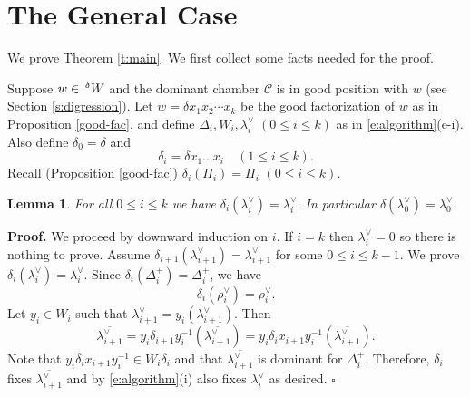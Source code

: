 \documentclass[10pt,leqno]{article}
\newtheorem{lemma}[equation]{Lemma}
\newcommand{\qed}{\hfill $\square$ \medskip}
\newenvironment{proof}[1][Proof]{\noindent\textbf{#1.} }{\qed}
\newcommand{\caC}{\mathcal C}
\renewcommand{\a}{\mathfrak a}
\newcommand{\ch}[1]{#1^\vee}
\renewcommand{\sec}[1]{\section{#1}
\renewcommand{\theequation}{\thesection.\arabic{equation}}
  \setcounter{equation}{0}}
\newcommand{\Wext}{\negthinspace\negthinspace\phantom{a}^\delta W}
\def\le{\leqslant}
\def\a{\alpha}
\def\d{\delta}
\def\l{\lambda}
\renewcommand{\sec}[1]{\section{#1}
\renewcommand{\theequation}{\thesection.\arabic{equation}}
  \setcounter{equation}{0}}
\begin{document}
\begin{comment}
Now one computes that $\l_1^\vee = \rho_1^\vee=(0, 3, 3, 5, 3, 0)$ and its dominant conjugate is $\overline{\l_1^\vee}=(3, 5, 6, 9, 6, 3)$. Note that $\rho^\vee=(8, 11, 15, 21, 15, 8)$. Then the full sequence gives
$$
t=\delta \exp(\frac{2\pi i}{6} \l_0)=\delta\exp(\frac{2\pi i}{6} (\rho^\vee + \overline{\l_1^\vee}))=\delta \exp(\frac{2\pi i}{6} (11, 16, 21, 30, 21, 11)).
$$
The partial sequence gives
$$
t'=\delta \exp(\frac{2\pi i}{3} \rho^\vee)=
\delta \exp(\frac{2\pi i}{6} (16, 22, 30, 42, 30, 16)).
$$
So $t \neq t'$. On the other hand, we have
\begin{gather*} t_1:=n(s_1 s_6) t n(s_1 s_6)^{-1} =\delta \exp(\frac{2\pi i}{6}(10, 16, 21, 30, 21, 10)); \\
t_2:=\a_3^\vee(-1) t_1 \a_3^\vee(-1)=\delta \exp(\frac{2\pi i}{6}(10, 16, 18, 30, 24, 10))=t'.
\end{gather*}
So $t$ is conjugate to $t'$.

\bigskip
\end{comment}

\sec{The General Case}
\label{s:general}

We prove Theorem \ref{t:main}. We first collect some facts needed for the proof.

Suppose $w\in \Wext$ and the dominant chamber $\caC$ is in good position with
$w$ (see Section \ref{s:digression}). Let $w=\d x_1 x_2 \cdots x_k$ be the good factorization of $w$ as
in Proposition \ref{good-fac}, and define $\Delta_i,W_i,\ch\lambda_i$
$(0\le i\le k)$ as in \eqref{e:algorithm}(e-i).
Also define $\delta_0=\delta$ and 
$$
\delta_i=\delta x_1\dots x_i\quad(1\le i\le k).
$$
Recall (Proposition \ref{good-fac}) $\delta_i(\Pi_i)=\Pi_i$ $(0\le i\le k)$.



\begin{lemma} \label{dom}
For all $0\le i\le k$ we have
$\delta_i(\ch\lambda_i)=\ch\lambda_i$. In particular $\delta(\ch\lambda_0)=\ch\lambda_0$.
\end{lemma}

\begin{proof}
We proceed by downward induction on $i$. If $i=k$ then $\ch\lambda_i=0$ so there is nothing to prove.
Assume
  $\d_{i+1}(\l_{i+1}^\vee) = \l_{i+1}^\vee$ for some
  $0 \le i \le k-1$. We prove $\d_i(\l_i^\vee)=\l_i^\vee$. Since
  $\d_{i}(\Delta_i^+)=\Delta_i^+$, we
  have $$\d_{i}(\rho_i^\vee)=\rho_i^\vee.$$ Let $y_i \in W_i$ such
  that $\overline{\l_{i+1}^\vee} =
  y_i(\l_{i+1}^\vee)$. Then
  $$\overline{\l_{i+1}^\vee}=y_i \d_{i+1} y_i^{-1}
  (\overline{\l_{i+1}^\vee}) =y_i \d_i x_{i+1} y_i^{-1}
  (\overline{\l_{i+1}^\vee}).$$ Note that
  $y_i \d_i x_{i+1} y_i^{-1} \in W_i\delta_i$ and that
  $\overline{\l_{i+1}^\vee}$ is dominant for $\Delta_i^+$. Therefore,
  $\d_i$ fixes $\overline{\l_{i+1}^\vee}$ and by \eqref{e:algorithm}(i) also fixes
  $\l_i^\vee$ as desired.
\end{proof}
\end{document}
